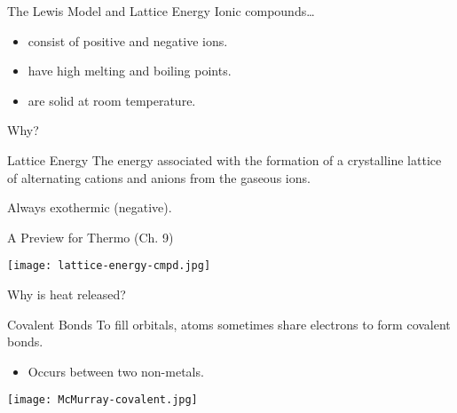 \documentclass[handout]{beamer}
\begin{document}
\begin{frame}{The Lewis Model and Lattice Energy}
	Ionic compounds\ldots
	\begin{itemize}
		\item consist of positive and negative ions.
		\item have high melting and boiling points.
		\item are solid at room temperature.
	\end{itemize}

	Why?

	\pause

	\bigskip

	\begin{block}{Lattice Energy}
		The energy associated with the formation of a crystalline
		lattice of alternating cations and anions from the gaseous ions.

		\alert{Always exothermic (negative)}.
	\end{block}

\end{frame}

\begin{frame}{A Preview for Thermo (Ch. 9)}
	\begin{center}
		\texttt{[image: lattice-energy-cmpd.jpg]}
	
		Why is heat released?
	\end{center}
\end{frame}


%

\begin{frame}{Covalent Bonds}
	To fill orbitals, atoms sometimes \alert{share}
	electrons to form \alert{covalent bonds}.
	\begin{itemize}
		\item Occurs between two non-metals.
	\end{itemize}
	
	\begin{center}
		\texttt{[image: McMurray-covalent.jpg]}
	\end{center}
\end{frame}
\end{document}
